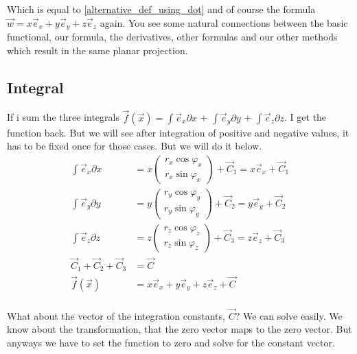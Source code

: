 \documentclass[a4paper]{article}
\begin{document}
\begin{Example}
Which is equal to \ref{alternative_def_using_dot} and of course the formula $\vec{w} = x\vec{e}_{x}+y\vec{e}_{y}+z\vec{e}_{z}$ again. You see some natural connections between the basic functional, our formula, the derivatives, other formulas and our other methods which result in the same planar projection.\\

\subsection{Integral}

If i sum the three integrals $\vec{f}(\vec{x}) = \int\vec{e}_{x}\partial{x}$ + $\int\vec{e}_{y}\partial{y}$ + $\int\vec{e}_{z}\partial{z}$. I get the function back. But we will see after integration of positive and negative values, it has to be fixed once for those cases. But we will do it below.\\

\begin{displaymath}
\begin{align}
\int\vec{e}_{x}\partial{x} &= x\begin{pmatrix}r_x\cos\varphi_x\\r_x\sin\varphi_x\end{pmatrix} + \vec{C}_{1} = x\vec{e}_{x} + \vec{C}_{1}\\
\int\vec{e}_{y}\partial{y} &= y\begin{pmatrix}r_y\cos\varphi_y\\r_y\sin\varphi_y\end{pmatrix} + \vec{C}_{2} = y\vec{e}_{y} + \vec{C}_{2}\\
\int\vec{e}_{z}\partial{z} &= z\begin{pmatrix}r_z\cos\varphi_z\\r_z\sin\varphi_z\end{pmatrix} + \vec{C}_{3} = z\vec{e}_{z} + \vec{C}_{3}\\
\vec{C}_{1} + \vec{C}_{2} + \vec{C}_{3} &= \vec{C}\\
\vec{f}(\vec{x}) &= x\vec{e}_{x} +y\vec{e}_{y} +z\vec{e}_{z} + \vec{C}\\
\end{align}
\end{displaymath}

What about the vector of the integration constants, $\vec{C}$? We can solve easily. We know about the transformation, that the zero vector maps to the zero vector. But anyways we have to set the function to zero and solve for the constant vector.\\


\end{Example}
\end{document}
